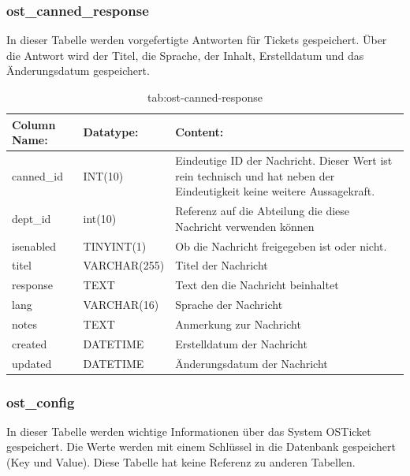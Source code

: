 \newpage
\subsubsection{ost\_canned\_response}

In dieser Tabelle werden vorgefertigte Antworten für Tickets gespeichert. Über die Antwort wird der Titel, die Sprache, der Inhalt, Erstelldatum und das Änderungsdatum gespeichert.

\begin{table}[h]
	\begin{tabular}{|p{3cm}|p{4cm}|p{7.7cm}|}
		\hline
		\textbf{Column Name:} & \textbf{Datatype:} & \textbf{Content:}\\
		\hline
		canned\_id & INT(10) & Eindeutige ID der Nachricht. Dieser Wert ist rein technisch und hat  neben der Eindeutigkeit keine weitere 
		Aussagekraft.\\
		\hline
		dept\_id & int(10) & Referenz auf die Abteilung die diese Nachricht verwenden können\\
		\hline
		isenabled & TINYINT(1) & Ob die Nachricht freigegeben ist oder nicht.\\
		\hline
		titel & VARCHAR(255) & Titel der Nachricht\\
		\hline
		response & TEXT & Text den die Nachricht beinhaltet\\
		\hline
		lang & VARCHAR(16) & Sprache der Nachricht\\
		\hline
		notes & TEXT & Anmerkung zur Nachricht\\
		\hline
		created & DATETIME & Erstelldatum der Nachricht\\
		\hline
		updated & DATETIME & Änderungsdatum der Nachricht\\
		\hline
	\end{tabular}
	\caption{tab:ost-canned-response}
\end{table}
\label{tab:ost_canned_response}


\subsubsection{ost\_config}

In dieser Tabelle werden wichtige Informationen über das System OSTicket gespeichert. Die Werte werden mit einem Schlüssel in die Datenbank gespeichert (Key und Value).
Diese Tabelle hat keine Referenz zu anderen Tabellen.

